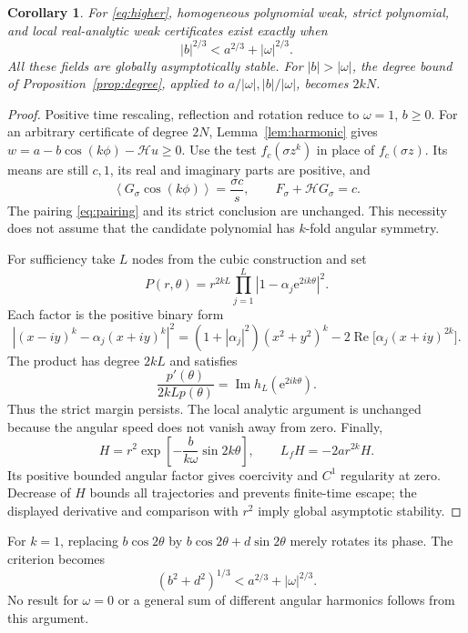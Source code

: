 \documentclass[11pt]{article}
\newtheorem{corollary}[theorem]{Corollary}
\theoremstyle{remark}\newtheorem{remark}[theorem]{Remark}
\newcommand{\Rea}{\operatorname{Re}}
\newcommand{\Ima}{\operatorname{Im}}
\newcommand{\avg}[1]{\left\langle #1\right\rangle}
\newcommand{\ee}{\mathrm e}
\begin{document}
\begin{corollary}\label{cor:higher}
For \eqref{eq:higher}, homogeneous polynomial weak, strict
polynomial, and local real-analytic weak certificates exist
exactly when
\begin{equation}\label{eq:highercriterion}
 |b|^{2/3}<a^{2/3}+|\omega|^{2/3}.
\end{equation}
All these fields are globally asymptotically stable.
For \(|b|>|\omega|\), the degree bound of
Proposition~\ref{prop:degree}, applied to
\(a/|\omega|,|b|/|\omega|\), becomes \(2kN\).
\end{corollary}
\begin{proof}
Positive time rescaling, reflection and rotation reduce to
\(\omega=1\), \(b\ge0\).
For an arbitrary certificate of degree \(2N\),
Lemma~\ref{lem:harmonic} gives
\(w=a-b\cos(k\phi)-\mathcal Hu\ge0\).
Use the test \(f_c(\sigma z^k)\) in place of
\(f_c(\sigma z)\). Its means are still \(c,1\),
its real and imaginary parts are positive, and
\[
 \avg{G_\sigma\cos(k\phi)}=\frac{\sigma c}{s},
 \qquad F_\sigma+\mathcal HG_\sigma=c.
\]
The pairing \eqref{eq:pairing} and its strict conclusion are
unchanged. This necessity does not assume that the candidate
polynomial has \(k\)-fold angular symmetry.

For sufficiency take \(L\) nodes from the cubic construction and set
\[
 P(r,\theta)=r^{2kL}
       \prod_{j=1}^L|1-\alpha_j\ee^{2ik\theta}|^2.
\]
Each factor is the positive binary form
\[
 |(x-iy)^k-\alpha_j(x+iy)^k|^2
 =(1+|\alpha_j|^2)(x^2+y^2)^k
       -2\Rea\bigl[\alpha_j(x+iy)^{2k}\bigr].
\]
The product has degree \(2kL\) and satisfies
\[
 \frac{p'(\theta)}{2kL p(\theta)}
       =\Ima h_L(\ee^{2ik\theta}).
\]
Thus the strict margin persists.
The local analytic argument is unchanged because the angular
speed does not vanish away from zero.
Finally,
\[
 H=r^2\exp\left[-\frac{b}{k\omega}\sin2k\theta\right],
 \qquad L_fH=-2ar^{2k}H.
\]
Its positive bounded angular factor gives coercivity and
\(C^1\) regularity at zero. Decrease of \(H\) bounds all
trajectories and prevents finite-time escape; the displayed
derivative and comparison with \(r^2\) imply global
asymptotic stability.
\end{proof}

For \(k=1\), replacing \(b\cos2\theta\) by
\(b\cos2\theta+d\sin2\theta\) merely rotates its phase.
The criterion becomes
\[
 (b^2+d^2)^{1/3}<a^{2/3}+|\omega|^{2/3}.
\]
No result for \(\omega=0\) or a general sum of different
angular harmonics follows from this argument.
\end{document}
